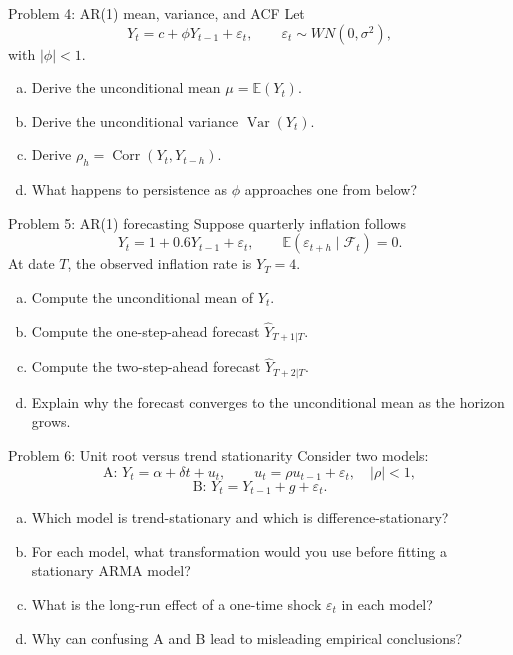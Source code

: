 \documentclass[10pt]{beamer}
\DeclareMathOperator{\Var}{Var}
\DeclareMathOperator{\Corr}{Corr}
\newcommand{\E}{\mathbb{E}}
\newcommand{\eps}{\varepsilon}
\newcommand{\calF}{\mathcal{F}}
\begin{document}
\begin{frame}{Problem 4: AR(1) mean, variance, and ACF}
\label{q4}
\small
Let
\[
Y_t=c+\phi Y_{t-1}+\eps_t,\qquad \eps_t\sim WN(0,\sigma^2),
\]
with $|\phi|<1$.

\begin{enumerate}[(a)]
  \item Derive the unconditional mean $\mu=\E(Y_t)$.
  \item Derive the unconditional variance $\Var(Y_t)$.
  \item Derive $\rho_h=\Corr(Y_t,Y_{t-h})$.
  \item What happens to persistence as $\phi$ approaches one from below?
\end{enumerate}

\vfill
\hfill\hyperlink{s4}{}
\end{frame}

\begin{frame}{Problem 5: AR(1) forecasting}
\label{q5}
\small
Suppose quarterly inflation follows
\[
Y_t=1+0.6Y_{t-1}+\eps_t,
\qquad \E(\eps_{t+h}\mid\calF_t)=0.
\]
At date $T$, the observed inflation rate is $Y_T=4$.

\begin{enumerate}[(a)]
  \item Compute the unconditional mean of $Y_t$.
  \item Compute the one-step-ahead forecast $\widehat Y_{T+1|T}$.
  \item Compute the two-step-ahead forecast $\widehat Y_{T+2|T}$.
  \item Explain why the forecast converges to the unconditional mean as the horizon grows.
\end{enumerate}

\vfill
\hfill\hyperlink{s5}{}
\end{frame}

\begin{frame}{Problem 6: Unit root versus trend stationarity}
\label{q6}
\small
Consider two models:
\[
\text{A: } Y_t=\alpha+\delta t+u_t,\qquad u_t=\rho u_{t-1}+\eps_t,\quad |\rho|<1,
\]
\[
\text{B: } Y_t=Y_{t-1}+g+\eps_t.
\]

\begin{enumerate}[(a)]
  \item Which model is trend-stationary and which is difference-stationary?
  \item For each model, what transformation would you use before fitting a stationary ARMA model?
  \item What is the long-run effect of a one-time shock $\eps_t$ in each model?
  \item Why can confusing A and B lead to misleading empirical conclusions?
\end{enumerate}

\vfill
\hfill\hyperlink{s6}{}
\end{frame}
\end{document}
